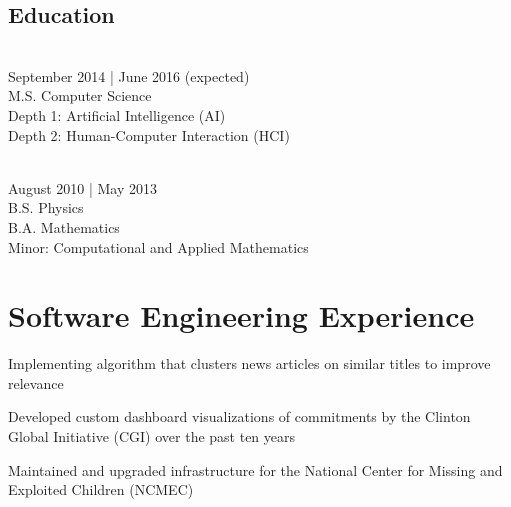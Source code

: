 \documentclass{onkursen-resume}
\begin{document}
\begin{multicols}{2}

\section*{Education}

\\
September 2014 | June 2016 (expected)\\
M.S. Computer Science\\
Depth 1: Artificial Intelligence (AI)\\
Depth 2: Human-Computer Interaction (HCI)\\

\vspace{6mm}

\\
August 2010 | May 2013\\
B.S. Physics\\
B.A. Mathematics\\
Minor: Computational and Applied Mathematics

\end{multicols}

\vspace{-2mm}

\hr

\section*{Software Engineering Experience}

\begin{itemize*}
\item Implementing algorithm that clusters news articles on similar titles to improve relevance
\end{itemize*}
\vspace{-1mm}

\begin{itemize*}
\item Developed custom dashboard visualizations of commitments by the Clinton Global Initiative (CGI) over the past ten years
\item Maintained and upgraded infrastructure for the National Center for Missing and Exploited Children (NCMEC)
\end{itemize*}
\vspace{-1mm}
\end{document}
